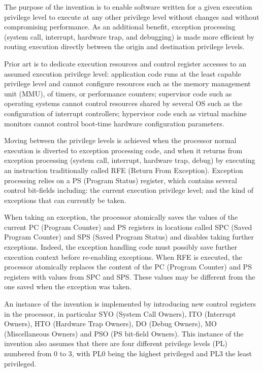 The purpose of the invention is to enable software written for a given execution privilege level to execute at any other privilege level without changes and without compromising performance. As an additional benefit, exception processing (system call, interrupt, hardware trap, and debugging) is made more efficient by routing execution directly between the origin and destination privilege levels.

Prior art is to dedicate execution resources and control register accesses to an assumed execution privilege level: application code runs at the least capable privilege level and cannot configure resources such as the memory management unit (MMU), of timers, or performance counters; supervisor code such as operating systems cannot control resources shared by several OS such as the configuration of interrupt controllers; hypervisor code such as virtual machine monitors cannot control boot-time hardware configuration parameters.

Moving between the privilege levels is achieved when the processor normal execution is diverted to exception processing code, and when it returns from exception processing (system call, interrupt, hardware trap, debug) by executing an instruction traditionally called RFE (Return From Exception). Exception processing relies on a PS (Program Status) register, which contains several control bit-fields including: the current execution privilege level; and the kind of exceptions that can currently be taken.

When taking an exception, the processor atomically saves the values of the current PC (Program Counter) and PS registers in locations called SPC (Saved Program Counter) and SPS (Saved Program Status) and disables taking further exceptions. Indeed, the exception handling code must possibly save further execution context before re-enabling exceptions. When RFE is executed, the processor atomically replaces the content of the PC (Program Counter) and PS registers with values from SPC and SPS. These values may be different from the one saved when the exception was taken.

An instance of the invention is implemented by introducing new control registers in the processor, in particular SYO (System Call Owners), ITO (Interrupt Owners), HTO (Hardware Trap Owners), DO (Debug Owners), MO (Miscellaneous Owners) and PSO (PS bit-field Owners). This instance of the invention also assumes that there are four different privilege levels (PL) numbered from 0 to 3, with PL0 being the highest privileged and PL3 the least privileged.

